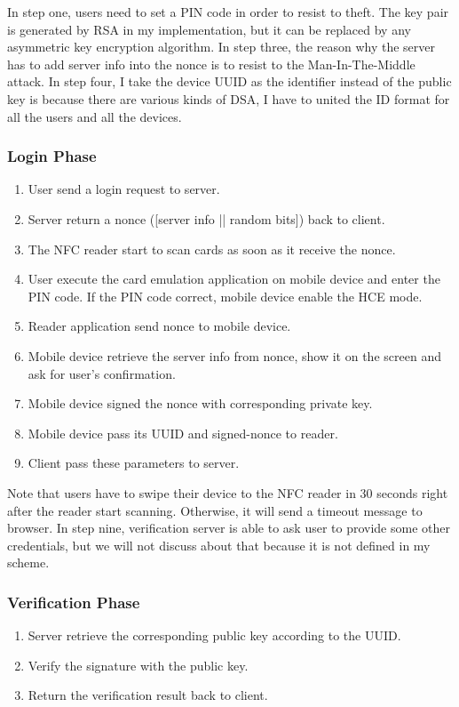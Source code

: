 \begin{CJK}{Bg5}{bsmi}
In step one, users need to set a PIN code in order to resist to theft. The key pair is generated by RSA in my implementation, but it can be replaced by any asymmetric key encryption algorithm. In step three, the reason why the server has to add server info into the nonce is to resist to the Man-In-The-Middle attack. In step four, I take the device UUID as the identifier instead of the public key is because there are various kinds of DSA, I have to united the ID format for all the users and all the devices.

\subsubsection{Login Phase}

\begin{enumerate}
\item User send a login request to server.
\item Server return a nonce ([server info || random bits]) back to client.
\item The NFC reader start to scan cards as soon as it receive the nonce.
\item User execute the card emulation application on mobile device and enter the PIN code. If the PIN code correct, mobile device enable the HCE mode.
\item Reader application send nonce to mobile device.
\item Mobile device retrieve the server info from nonce, show it on the screen and ask for user's confirmation.
\item Mobile device signed the nonce with corresponding private key.
\item Mobile device pass its UUID and signed-nonce to reader.
\item Client pass these parameters to server.
\end{enumerate}

Note that users have to swipe their device to the NFC reader in 30 seconds right after the reader start scanning. Otherwise, it will send a timeout message to browser. In step nine, verification server is able to ask user to provide some other credentials, but we will not discuss about that because it is not defined in my scheme.

\subsubsection{Verification Phase}

\begin{enumerate}
\item Server retrieve the corresponding public key according to the UUID.
\item Verify the signature with the public key.
\item Return the verification result back to client.
\end{enumerate}


\end{CJK}
